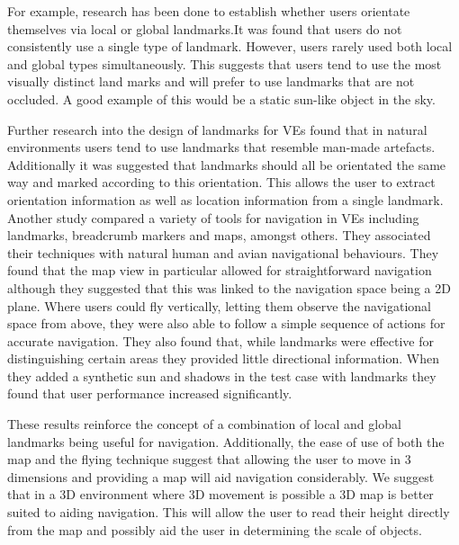 \documentclass{sig-alternate-05-2015}
\begin{document}
For example, research has been done to establish whether users orientate themselves via local or global landmarks\cite{Steck2000}.It was found that users do not consistently use a single type of landmark. However, users rarely used both local and global types simultaneously. This suggests that users tend to use the most visually distinct land marks and will prefer to use landmarks that are not occluded. A good example of this would be a static sun-like object in the sky. %

Further research into the design of landmarks for VEs found that in natural environments users tend to use landmarks that resemble man-made artefacts\cite{Vinson1999}. Additionally it was suggested that landmarks should all be orientated the same way and marked according to this orientation. This allows the user to extract orientation information as well as location information from a single landmark.\\

Another study compared a variety of tools for navigation in VEs including landmarks, breadcrumb markers and maps, amongst others\cite{Darken1993}. They associated their techniques with natural human and avian  navigational behaviours. They found that the map view in particular allowed for straightforward navigation although they suggested that this was linked to the navigation space being a 2D plane. Where users could fly vertically, letting them observe the navigational space from above, they were also able to follow a simple sequence of actions for accurate navigation. They also found that, while landmarks were effective for distinguishing certain areas they provided little directional information. When they added a synthetic sun and shadows in the test case with landmarks they found that user performance increased significantly. %

These results reinforce the concept of a combination of local and global landmarks being useful for navigation\cite{Darken1993}. Additionally, the ease of use of both the map and the flying technique suggest that allowing the user to move in 3 dimensions and providing a map will aid navigation considerably. We suggest that in a 3D environment where 3D movement is possible a 3D map is better suited to aiding navigation. This will allow the user to read their height directly from the map and possibly aid the user in determining the scale of objects.\\
\end{document}
